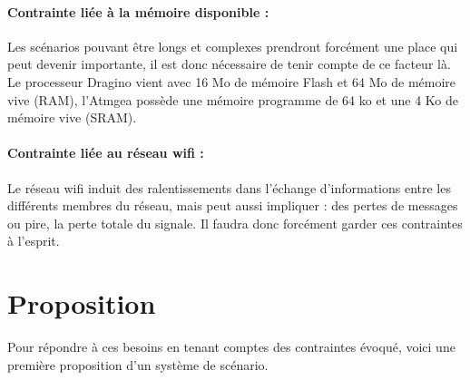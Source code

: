 \paragraph{Contrainte liée à la mémoire disponible :}
Les scénarios pouvant être longs et complexes prendront forcément une place qui peut devenir importante, il est donc nécessaire de tenir compte de ce facteur là. Le processeur Dragino vient avec 16 Mo de mémoire Flash et 64 Mo de mémoire vive (RAM), l'Atmgea possède une mémoire programme de 64 ko et une 4 Ko de mémoire vive (SRAM).
\paragraph{Contrainte liée au réseau wifi :}
Le réseau wifi induit des ralentissements dans l'échange d'informations entre les différents membres du réseau, mais peut aussi impliquer : des pertes de messages ou pire, la perte totale du signale. Il faudra donc forcément garder ces contraintes à l'esprit.

\section{Proposition}
Pour répondre à ces besoins en tenant comptes des contraintes évoqué, voici une première proposition d'un système de scénario.
